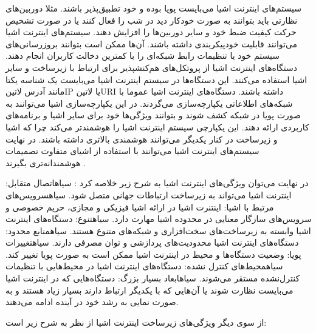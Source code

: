 سیستم‌های اینترنت اشیا می‌بایست پویا بوده و خود تطبیق‌پذیر باشند. مثلا دوربین‌های نظارتی باید بتوانند به صورت خودکار دید در شب را فعال کنند یا در صورت تشخیص حرکت
کیفیت ضبط خود و سایر دوربین‌ها را افزایش دهند. سیستم‌های اینترنت اشیا می‌توانند قابلیت خودپیکربندی داشته باشند. آن‌ها ممکن است بتوانند بروزرسانی‌های سیستم خود یا
تنظیمات رابط شبکه‌ای را با کمترین دخالت کاربران انجام دهند. دستگاه‌های اینترنت اشیا از پروتکل‌های هم‌کنشپذیر برای ارتباط با زیرساخت و سایر اشیا استفاده می‌کنند.
این دستگاه‌ها در سیستم اینترنت اشیا می‌بایست یک شناسه یکتا مانند آدرس ‌لاتین{IP} یا ‌لاتین{URI} داشته باشند. دستگاه‌های اینترنت اشیا عموما با شبکه‌های اطلاعاتی
یکپارچه‌سازی می‌گردند. در این یکپارچه‌سازی اشیا می‌توانند به صورت پویا در شبکه کشف شوند و بتوانند ویژگی‌ها خود برای سایر اشیا و برنامه‌های کاربردی ارائه دهند. این یکپارچی
سیستم اینترنت اشیا را هوشمندتر می‌کند چرا که اشیا و زیرساخت در کنار یکدیگر می‌توانند هوشمندی بالاتری داشته باشند.
در نهایت سیستم‌های اینترنت اشیا می‌توانند با استفاده از اشیای متفاوت تصمیمات هوشمندانه‌تری بگیرند
.

در نهایت می‌توان ویژگی‌های اینترنت اشیا به شرح زیر خلاصه کرد
:
 ‌سیاه{اتصال متقابل}: اینترنت اشیا می‌تواند به زیرساخت ارتباطات جهانی متصل شود.
 ‌سیاه{سرویس‌های مرتبط با اشیا}: اینتنرت اشیا در ارائه اشیا فیزیکی و مجازی، حریم خصوصی و سرویس‌های سازگار معنایی در محدوده اشیا مهارت دارد.
 ‌سیاه{تنوع}: دستگاه‌های اینترنت اشیا وابسته به زیرساخت‌های سخت‌افزاری و شبکه‌های متنوع هستند.
 ‌سیاه{منابع محدود}: دستگاه‌های اینترنت اشیا محدودیت‌های پردازشی و توان مصرفی دارند.
 ‌سیاه{تغییرات پویا}: وضعیت دستگاه‌ها و محیط در اینترنت اشیا ممکن است به صورت پویا تغییر کند.
 ‌سیاه{محیط‌های کنترل نشده}: دستگاه‌های اینترنت اشیا در محیط‌هایی با تنظیمات کنترل‌نشده مستقر می‌شوند.
 ‌سیاه{ابعاد بسیار بزرگ}: دستگاه‌هایی که در اینترنت اشیا می‌بایست نظارت شوند یا آن‌هایی که با یکدیگر ارتباط دارند بسیار زیاد هستند و به صورت نمایی به رشد خود در آینده ادامه می‌دهند.

از سوی دیگر ویژگی‌های زیرساخت اینترنت اشیا از نظر  به شرح زیر است:


